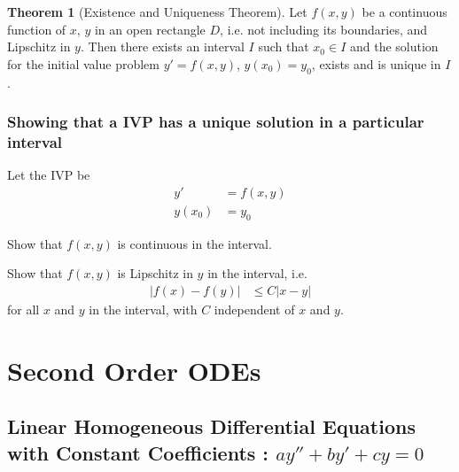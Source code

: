 \documentclass[fleqn, a4paper, 12pt, twoside]{article}
\theoremstyle{definition}
\theoremstyle{theorem}
\newtheorem{theorem}{Theorem}
\begin{document}
\begin{theorem}[Existence and Uniqueness Theorem]
	Let $f(x,y)$ be a continuous function of $x$, $y$ in an open rectangle $D$, i.e. not including its boundaries, and Lipschitz in $y$.
	Then there exists an interval $I$ such that $x_0 \in I$ and the solution for the initial value problem $y' = f(x,y)$, $y(x_0) = y_0$, exists and is unique in $I$.
\end{theorem}

\subsubsection{Showing that a IVP has a unique solution in a particular interval}

\begin{algorithmic}[1]
	\item
		Let the IVP be
		\begin{align*}
			y' &= f(x,y)\\
			y(x_0) &= y_0
		\end{align*}
	\item
		Show that $f(x,y)$ is continuous in the interval.
	\item
		Show that $f(x,y)$ is Lipschitz in $y$ in the interval, i.e.
		\begin{align*}
			\left| f(x) - f(y) \right| &\le C |x - y|
		\end{align*}
		for all $x$ and $y$ in the interval, with $C$ independent of $x$ and $y$.
\end{algorithmic}

\section{Second Order ODEs}

\subsection{Linear Homogeneous Differential Equations with Constant Coefficients : $a y'' + b y' + c y = 0$}
\end{document}
